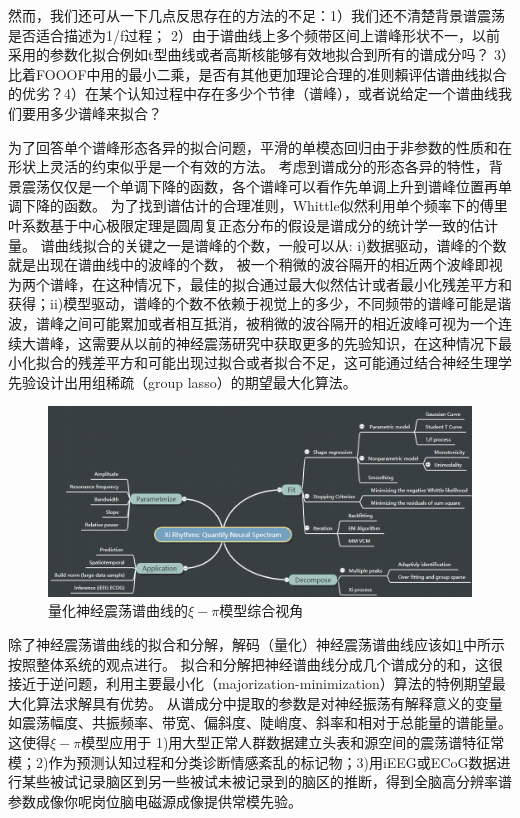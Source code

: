 然而，我们还可从一下几点反思存在的方法的不足：1）我们还不清楚背景谱震荡是否适合描述为1/f过程； 2）由于谱曲线上多个频带区间上谱峰形状不一，以前采用的参数化拟合例如t型曲线或者高斯核能够有效地拟合到所有的谱成分吗？ 3）比着FOOOF中用的最小二乘，是否有其他更加理论合理的准则賴评估谱曲线拟合的优劣？4）在某个认知过程中存在多少个节律（谱峰），或者说给定一个谱曲线我们要用多少谱峰来拟合？

为了回答单个谱峰形态各异的拟合问题，平滑的单模态回归由于非参数的性质和在形状上灵活的约束似乎是一个有效的方法。 考虑到谱成分的形态各异的特性，背景震荡仅仅是一个单调下降的函数，各个谱峰可以看作先单调上升到谱峰位置再单调下降的函数。 为了找到谱估计的合理准则，Whittle似然利用单个频率下的傅里叶系数基于中心极限定理是圆周复正态分布的假设是谱成分的统计学一致的估计量。 谱曲线拟合的关键之一是谱峰的个数，一般可以从: i)数据驱动，谱峰的个数就是出现在谱曲线中的波峰的个数， 被一个稍微的波谷隔开的相近两个波峰即视为两个谱峰，在这种情况下，最佳的拟合通过最大似然估计或者最小化残差平方和获得；ii)模型驱动，谱峰的个数不依赖于视觉上的多少，不同频带的谱峰可能是谐波，谱峰之间可能累加或者相互抵消，被稍微的波谷隔开的相近波峰可视为一个连续大谱峰，这需要从以前的神经震荡研究中获取更多的先验知识，在这种情况下最小化拟合的残差平方和可能出现过拟合或者拟合不足，这可能通过结合神经生理学先验设计出用组稀疏（group lasso）的期望最大化算法。

\begin{figure}[!ht]
\includegraphics[width=15cm]{pic/xipi/figure1.png}
\caption{量化神经震荡谱曲线的$\xi-\pi$模型综合视角}
\label{fig1}
\end{figure}

除了神经震荡谱曲线的拟合和分解，解码（量化）神经震荡谱曲线应该如\ref{fig1}中所示按照整体系统的观点进行。 拟合和分解把神经谱曲线分成几个谱成分的和，这很接近于逆问题，利用主要最小化（majorization-minimization）算法的特例期望最大化算法求解具有优势。 从谱成分中提取的参数是对神经振荡有解释意义的变量如震荡幅度、共振频率、带宽、偏斜度、陡峭度、斜率和相对于总能量的谱能量。 这使得$\xi-\pi$模型应用于 1)用大型正常人群数据建立头表和源空间的震荡谱特征常模；2)作为预测认知过程和分类诊断情感紊乱的标记物；3)用iEEG或ECoG数据进行某些被试记录脑区到另一些被试未被记录到的脑区的推断，得到全脑高分辨率谱参数成像你呢岗位脑电磁源成像提供常模先验。

